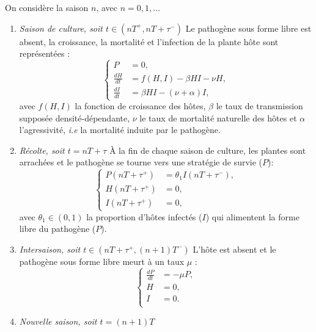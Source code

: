 	On considère la saison $n$, avec $n=0,1,\ldots$
\begin{enumerate}
\item \emph{Saison de culture, soit $t\in(nT^+,nT+\tau^-)$}\quad
Le pathogène sous forme libre est absent, la croissance, la mortalité et l'infection de la plante hôte sont représentées : 
	\begin{equation}
	  \left\{
	    \begin{aligned}
	      P~ &= 0, \\
	      \frac{dH}{dt} &=  f(H,I) - \beta HI - \nu H,   \\
	      \frac{dI}{dt} &= \beta HI - (\nu+\alpha) I,
	    \end{aligned}
	  \right.
	  \label{eq:vandenberg-saison}
	\end{equation}
	avec $f(H,I)$ la fonction de croissance des hôtes, $\beta$ le taux de transmission supposée densité-dépendante, $\nu$ le taux de mortalité naturelle des hôtes et $\alpha$ l'agressivité, \textit{i.e} la mortalité induite par le pathogène.
	\item  \emph{Récolte, soit $t=nT+\tau$}\quad
	  À la fin de chaque saison de culture, les plantes sont arrachées et le pathogène se tourne vers une stratégie de survie ($P$):
	  \begin{equation}
	    \left\{
	      \begin{aligned}
	        P(nT+ \tau^{+}) &= \theta_1 I(nT+\tau^{-}),\\
	        H(nT+ \tau^{+}) &=0,   \\
	        I(nT+ \tau^{+}) &=0,
	      \end{aligned}
	    \right.
	    \label{eq:vandenberg-recolte}
	  \end{equation}
	  avec $\theta_1\in(0,1)$ la proportion d'hôtes infectés ($I$) qui alimentent la forme libre du pathogène ($P$). 
	\item  \emph{Intersaison, soit $t\in(nT+\tau^+,(n+1)T^-)$}\quad
	  L'hôte est absent et le pathogène sous forme libre  meurt à un taux $\mu$ :
	  \begin{equation}
	    \left\{
	      \begin{aligned}
	        \frac{dP}{dt} & = -\mu P, \\
	        H &= 0, \\
	        I~ &= 0. \\
	        \end{aligned}
	    \right.
	    \label{eq:vandenberg-intersaison}
	\end{equation} 
	\item  \emph{Nouvelle saison, soit $t=(n+1)T$}\quad

\end{enumerate}
